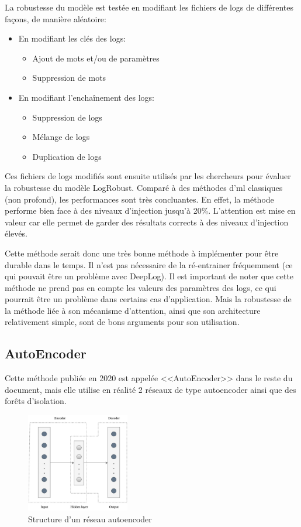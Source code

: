 \documentclass[openany, 11pt]{memoir}
\begin{document}
\bigskip
La robustesse du modèle est testée en modifiant les fichiers de \glspl{log} de différentes façons, de manière aléatoire:

\begin{itemize}
	\item En modifiant les clés des logs:
	\begin{itemize}
		\item Ajout de mots et/ou de paramètres
		\item Suppression de mots
	\end{itemize}
	\item En modifiant l'enchaînement des logs:
	\begin{itemize}
		\item Suppression de logs
		\item Mélange de logs
		\item Duplication de logs
	\end{itemize}
\end{itemize}

Ces fichiers de \glspl{log} modifiés sont ensuite utilisés par les chercheurs pour évaluer la robustesse du modèle LogRobust. Comparé à des méthodes d'\gls{ml} classiques (non profond), les performances sont très concluantes. En effet, la méthode performe bien face à des niveaux d'injection jusqu'à 20\%. L'attention est mise en valeur car elle permet de garder des résultats corrects à des niveaux d'injection élevés.

\bigskip
Cette méthode serait donc une très bonne méthode à implémenter pour être durable dans le temps. Il n'est pas nécessaire de la ré-entrainer fréquemment (ce qui pouvait être un problème avec DeepLog). Il est important de noter que cette méthode ne prend pas en compte les valeurs des paramètres des \glspl{log}, ce qui pourrait être un problème dans certains cas d'application. Mais la robustesse de la méthode liée à son mécanisme d'attention, ainsi que son architecture relativement simple, sont de bons arguments pour son utilisation.

\subsection{AutoEncoder}

Cette méthode publiée en 2020 \cite{autoencoder} est appelée <<AutoEncoder>> dans le reste du document, mais elle utilise en réalité 2 réseaux de type autoencoder ainsi que des forêts d'isolation.

\begin{figure}[ht]
	\centering
	\includegraphics[width=0.4\textwidth]{images/autoencoder.png}
	\caption{Structure d'un réseau autoencoder}
	\label{autoencoder}
\end{figure}
\end{document}
